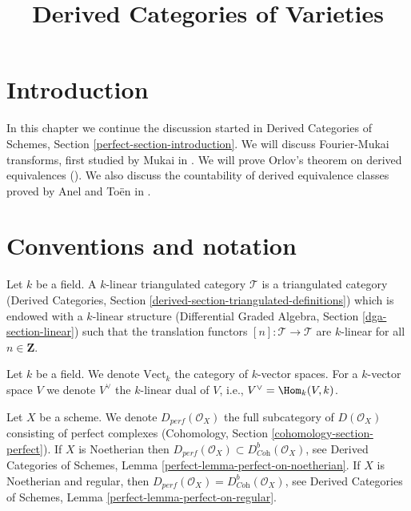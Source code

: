 

%


\title{Derived Categories of Varieties}


\maketitle

\label{section-phantom}

\tableofcontents

\section{Introduction}
\label{section-introduction}

\noindent
In this chapter we continue the discussion started in
Derived Categories of Schemes, Section \ref{perfect-section-introduction}.
We will discuss Fourier-Mukai transforms,
first studied by Mukai in \cite{Mukai}.
We will prove Orlov's theorem on derived equivalences (\cite{Orlov-K3}).
We also discuss the countability of derived equivalence
classes proved by Anel and To\"en in \cite{AT}.




\section{Conventions and notation}
\label{section-conventions}

\noindent
Let $k$ be a field. A $k$-linear triangulated category $\mathcal{T}$
is a triangulated category (Derived Categories, Section
\ref{derived-section-triangulated-definitions})
which is endowed with a $k$-linear structure
(Differential Graded Algebra, Section \ref{dga-section-linear})
such that the translation functors $[n] : \mathcal{T} \to \mathcal{T}$
are $k$-linear for all $n \in \mathbf{Z}$.

\medskip\noindent
Let $k$ be a field. We denote $\text{Vect}_k$ the category of
$k$-vector spaces. For a $k$-vector space $V$ we denote
$V^\vee$ the $k$-linear dual of $V$, i.e., $V^\vee = \Hom_k(V, k)$.

\medskip\noindent
Let $X$ be a scheme. We denote $D_{perf}(\mathcal{O}_X)$ the full
subcategory of $D(\mathcal{O}_X)$ consisting of perfect complexes
(Cohomology, Section \ref{cohomology-section-perfect}).
If $X$ is Noetherian then
$D_{perf}(\mathcal{O}_X) \subset D^b_{\textit{Coh}}(\mathcal{O}_X)$, see
Derived Categories of Schemes, Lemma \ref{perfect-lemma-perfect-on-noetherian}.
If $X$ is Noetherian and regular, then
$D_{perf}(\mathcal{O}_X) = D^b_{\textit{Coh}}(\mathcal{O}_X)$, see
Derived Categories of Schemes, Lemma \ref{perfect-lemma-perfect-on-regular}.

